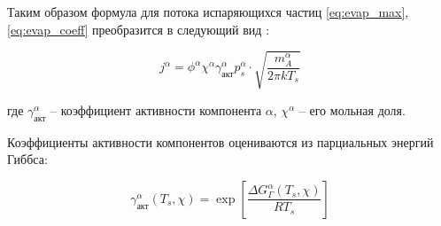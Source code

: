 Таким образом формула для потока испаряющихся частиц \ref{eq:evap_max}, \ref{eq:evap_coeff} преобразится в следующий вид \cite{klassen2018simulation}:

\begin{equation}
\label{eq:evap_multicomp_flow}
    j^{\alpha} = \phi^\alpha\chi^\alpha\gamma_{\text{акт}}^\alpha p^{\alpha}_s \cdot \sqrt{\frac{m_A^\alpha}{2\pi k T_s}}
\end{equation}

\noindent
где $\gamma_{\text{акт}}^\alpha$ -- коэффициент активности компонента $\alpha$, $\chi^\alpha$ -- его мольная доля.

Коэффициенты активности компонентов оцениваются из парциальных энергий Гиббса:

\begin{equation}
    \gamma_{\text{акт}}^\alpha(T_s, \chi) = \exp\left[ \frac{\Delta G^\alpha_\Gamma (T_s, \chi)}{RT_s} \right]
\end{equation}


